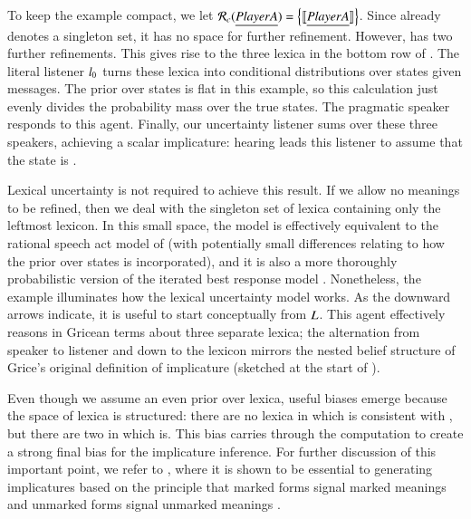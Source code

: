 \documentclass[leqno,12pt]{article}
\begin{document}
To keep the example compact, we let
$\mathcal{R}_{c}(\emph{Player A}) = \left\{ \llbracket\emph{Player A}\rrbracket \right\}$. Since
 already denotes a singleton set, it has no space for
further refinement. However,  has two further
refinements. This gives rise to the three lexica in the bottom row of
. The literal listener $l_{0}$ turns
these lexica into conditional distributions over states given
messages.  The prior over states is flat in this example, so this
calculation just evenly divides the probability mass over the true
states. The pragmatic speaker responds to this agent. 
Finally, our uncertainty listener sums over these three speakers,
achieving a scalar implicature: hearing  leads
this listener to assume that the state is .

Lexical uncertainty is not required to achieve this result. If we
allow no meanings to be refined, then we deal with the singleton set
of lexica containing only the leftmost lexicon. In this small space,
the model is effectively equivalent to the rational speech act model of
\citet{Frank:Goodman:2012} (with potentially small differences
relating to how the prior over states is incorporated), and it is also
a more thoroughly probabilistic version of the iterated best response
model \citep{Franke09DISS,Jaeger:2007,Jaeger:2011}. Nonetheless, the
example illuminates how the lexical uncertainty model works. As the
downward arrows indicate, it is useful to start conceptually from
$L$. This agent effectively reasons in Gricean
terms about three separate lexica; the alternation from speaker to
listener and down to the lexicon mirrors the nested belief structure
of Grice's original definition of implicature (sketched at the start
of ).

Even though we assume an even prior over lexica, useful biases emerge
because the space of lexica is structured: there are no lexica in
which  is consistent with , but there are two in
which  is. This bias carries through the computation to
create a strong final bias for the implicature inference. For further
discussion of this important point, we refer to
\citet{Bergen:Levy:Goodman:2014}, where it is shown to be essential to
generating implicatures based on the principle that marked forms
signal marked meanings and unmarked forms signal unmarked meanings
\citep{McCawley78,Horn84,Blutner98,Levinson00}.
\end{document}
